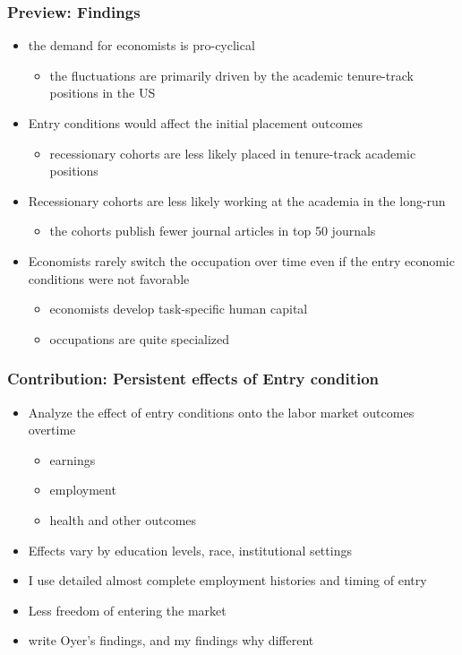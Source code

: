 \documentclass[11pt]{beamer}
\begin{document}
\begin{frame}
	\frametitle{Preview: Findings}
	\begin{itemize}
			\item the demand for economists is pro-cyclical
			\begin{itemize}
				\item the fluctuations are primarily driven by the academic tenure-track positions in the US
			\end{itemize}
			\vspace{1mm}
			\item Entry conditions would affect the initial placement outcomes
			\begin{itemize}
				\item  recessionary cohorts are less likely placed in tenure-track academic positions
			\end{itemize}
			\vspace{1mm}
			\item Recessionary cohorts are less likely working at the academia in the long-run
			\begin{itemize}
				\item the cohorts publish fewer journal articles in top 50 journals
			\end{itemize}
			\vspace{1mm}
			\item Economists rarely switch the occupation over time even if the entry economic conditions were not favorable
			\begin{itemize}
				\item economists develop task-specific human capital
				\item occupations are quite specialized
			\end{itemize}
	\end{itemize}
\end{frame}




\begin{frame}
	\frametitle{Contribution: Persistent effects of Entry condition} 
	\begin{itemize}
		\item Analyze the effect of entry conditions onto the labor market outcomes overtime
		\begin{itemize}
			\item earnings
			\item employment 
			\item health and other outcomes
		\end{itemize}
		\item Effects vary by education levels, race, institutional settings 

		\item I use detailed almost complete employment histories and timing of entry
		\item Less freedom of entering the market
		
		\item write Oyer's findings, and my findings why different
	\end{itemize}
\end{frame}
\end{document}
